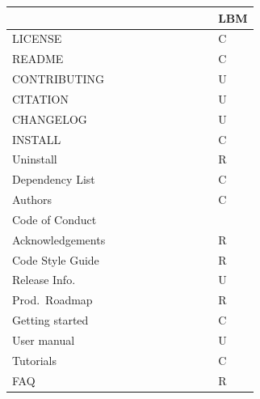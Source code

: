 \documentclass[runningheads]{llncs}
\begin{document}
\begin{table}[!h]
	\begin{center}
	\begin{tabular}{ p{2.5cm}p{1cm}p{1cm}p{1cm}p{1cm}p{1cm}p{1cm}p{1cm}p{1cm}p{1cm}p{0.8cm} }
	\toprule
	~ \ & \cite{USGS2019} & \cite{TobiasEtAl2018} & \cite{BrettEtAl2021} & \cite{WilsonEtAl2016} & \cite{SmithAndRoscoe2018} & \cite{HerouxEtAl2008} & \cite{ThielEtAl2020} & \cite{vanGompelEtAl2016} & \cite{OrvizEtAl2017} & LBM\\
	\midrule
	LICENSE & \checkmark & \checkmark & \checkmark & \checkmark & \checkmark & & \checkmark & \checkmark & \checkmark & C\\
	README &  & \checkmark & \checkmark & \checkmark & \checkmark & & \checkmark & \checkmark & \checkmark & C\\
	CONTRIBUTING &  & \checkmark & \checkmark & \checkmark & \checkmark & & \checkmark & \checkmark & \checkmark & U\\
	CITATION &  &  &  & \checkmark & & & & \checkmark & \checkmark & U\\
	CHANGELOG &  & \checkmark &  & \checkmark & \checkmark & & \checkmark &  &  & U\\
	INSTALL &  &  &  &  & \checkmark & & \checkmark & \checkmark & \checkmark & C\\
	\midrule
	Uninstall &  &  &  &  & & & & \checkmark & & R\\
	Dependency List &  &  & \checkmark & & \checkmark & & & \checkmark &  & C\\
	Authors &  &  &  &  &  &  & \checkmark & \checkmark & \checkmark & C\\
	Code of Conduct &  &  &  &  & & & \checkmark & & & \\
	Acknowledgements &  &  &  &  &  &  & \checkmark & \checkmark & \checkmark & R\\
	Code Style Guide &  & \checkmark &  &  & & & \checkmark & \checkmark & \checkmark & R\\
	Release Info. &  & \checkmark &  &  & & \checkmark & \checkmark & & & U\\
	Prod.\ Roadmap &  &  &  &  & & \checkmark & \checkmark & \checkmark & & R\\
	\midrule
	Getting started &  &  &  &  & \checkmark & & \checkmark & \checkmark & \checkmark & C\\
	User manual &  &  & \checkmark &  & & & \checkmark & & & U\\
	Tutorials &  &  &  &  & & & \checkmark & & & C\\
	FAQ &  &  &  &  & & & \checkmark & \checkmark & \checkmark & R\\

\end{tabular}
\end{center}
\end{table}
\end{document}

